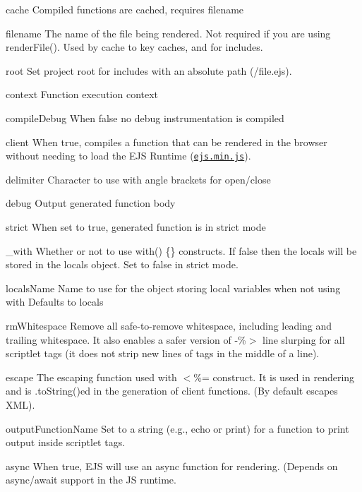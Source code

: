 \begin{DoxyItemize}
\item {\ttfamily cache} Compiled functions are cached, requires {\ttfamily filename}
\item {\ttfamily filename} The name of the file being rendered. Not required if you are using {\ttfamily render\+File()}. Used by {\ttfamily cache} to key caches, and for includes.
\item {\ttfamily root} Set project root for includes with an absolute path (/file.ejs).
\item {\ttfamily context} Function execution context
\item {\ttfamily compile\+Debug} When {\ttfamily false} no debug instrumentation is compiled
\item {\ttfamily client} When {\ttfamily true}, compiles a function that can be rendered in the browser without needing to load the E\+JS Runtime (\href{https://github.com/mde/ejs/releases/latest}{\tt ejs.\+min.\+js}).
\item {\ttfamily delimiter} Character to use with angle brackets for open/close
\item {\ttfamily debug} Output generated function body
\item {\ttfamily strict} When set to {\ttfamily true}, generated function is in strict mode
\item {\ttfamily \+\_\+with} Whether or not to use {\ttfamily with() \{\}} constructs. If {\ttfamily false} then the locals will be stored in the {\ttfamily locals} object. Set to {\ttfamily false} in strict mode.
\item {\ttfamily locals\+Name} Name to use for the object storing local variables when not using {\ttfamily with} Defaults to {\ttfamily locals}
\item {\ttfamily rm\+Whitespace} Remove all safe-\/to-\/remove whitespace, including leading and trailing whitespace. It also enables a safer version of {\ttfamily -\/\%$>$} line slurping for all scriptlet tags (it does not strip new lines of tags in the middle of a line).
\item {\ttfamily escape} The escaping function used with {\ttfamily $<$\%=} construct. It is used in rendering and is {\ttfamily .to\+String()}ed in the generation of client functions. (By default escapes X\+ML).
\item {\ttfamily output\+Function\+Name} Set to a string (e.\+g., \textquotesingle{}echo\textquotesingle{} or \textquotesingle{}print\textquotesingle{}) for a function to print output inside scriptlet tags.
\item {\ttfamily async} When {\ttfamily true}, E\+JS will use an async function for rendering. (Depends on async/await support in the JS runtime.
\end{DoxyItemize}

